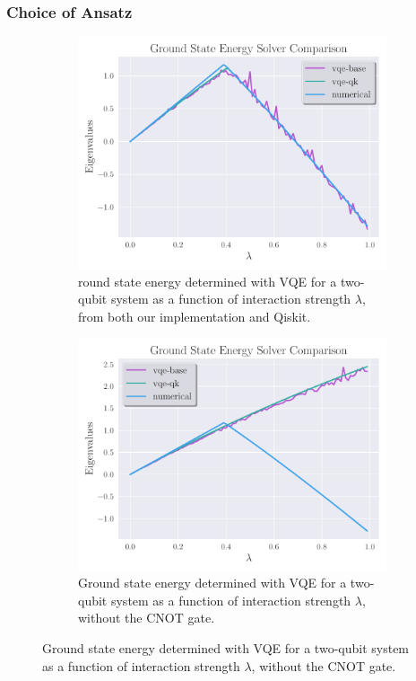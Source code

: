 \documentclass{beamer}
\begin{document}
\begin{frame}[t]
	\frametitle{Choice of Ansatz}

	\begin{figure}[ht]
		\centering
		\begin{subfigure}[b]{0.45\textwidth}
		\begin{center}
			\includegraphics[width=\textwidth]{../src/plots/2qb-all.pdf}
		\end{center}
		\caption{round state energy determined with VQE for a two-qubit system as a function of interaction strength $\lambda$, from both our implementation and Qiskit.}
		\label{fig:2qb-all}
		\end{subfigure}
		\hfill
		\begin{subfigure}[b]{0.45\textwidth}
		\begin{center}
			\includegraphics[width=\textwidth]{../src/plots/2qb-better.pdf}	
		\end{center}
		\caption{Ground state energy determined with VQE for a two-qubit system as a function of interaction strength $\lambda$, without the CNOT gate.}
		\label{fig:2-qb-all}
		\end{subfigure}
		\label{fig:2-qb}
	\end{figure}

	
\end{frame}
\end{document}
